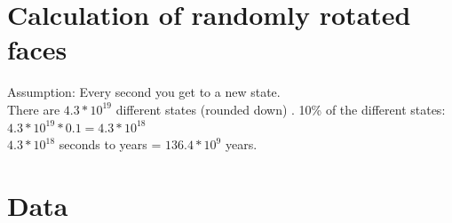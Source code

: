 \documentclass[a4paper,11pt]{kth-mag}
\begin{document}
\renewcommand{\bibname}{References}



\appendix
\addappheadtotoc
\chapter{Calculation of randomly rotated faces}\label{appA}
Assumption: Every second you get to a new state.\\
There are $4.3*10^{19}$  different states (rounded down) \cite{Faculty}.
10\% of the different states:\\
$4.3*10^{19}*0.1=4.3*10^{18}$ \\
$4.3*10^{18}$ seconds to years = $136.4*10^{9}$ years.

\label{App:AppendixB}
\chapter{Data}
	
\end{document}
